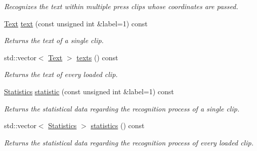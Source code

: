 \begin{CompactItemize}
\begin{CompactList}\small\item\em Recognizes the text within multiple press clips whose coordinates are passed. \item\end{CompactList}\item 
\hyperlink{class_text}{Text} \hyperlink{class_recognizer_343b5b6f98ab483fd239ecddb9b43f2d}{text} (const unsigned int \&label=1) const 
\begin{CompactList}\small\item\em Returns the text of a single clip. \item\end{CompactList}\item 
std::vector$<$ \hyperlink{class_text}{Text} $>$ \hyperlink{class_recognizer_6f3142f487a85cc4a6259cd5f8b8d7ba}{texts} () const 
\begin{CompactList}\small\item\em Returns the text of every loaded clip. \item\end{CompactList}\item 
\hyperlink{class_statistics}{Statistics} \hyperlink{class_recognizer_7fd7d8cb29549f884b68f80628a6b8c9}{statistic} (const unsigned int \&label=1) const 
\begin{CompactList}\small\item\em Returns the statistical data regarding the recognition process of a single clip. \item\end{CompactList}\item 
std::vector$<$ \hyperlink{class_statistics}{Statistics} $>$ \hyperlink{class_recognizer_82b28c720acc5fcc26059a6b4ba93c1a}{statistics} () const 
\begin{CompactList}\small\item\em Returns the statistical data regarding the recognition process of every loaded clip. \item\end{CompactList}\end{CompactItemize}
